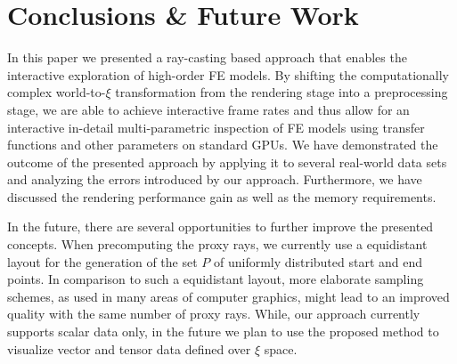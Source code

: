 \documentclass[journal]{vgtc}                %
\begin{document}
\section{Conclusions \& Future Work}\label{sec:conclusions}
In this paper we presented a ray-casting based approach that enables the interactive exploration of high-order FE models. By shifting the computationally complex world-to-$\xi$ transformation from the rendering stage into a preprocessing stage, we are able to achieve interactive frame rates and thus allow for an interactive in-detail multi-parametric inspection of FE models using transfer functions and other parameters on standard GPUs. We have demonstrated the outcome of the presented approach by applying it to several real-world data sets and analyzing the errors introduced by our approach. Furthermore, we have discussed the rendering performance gain as well as the memory requirements.

In the future, there are several opportunities to further improve the presented concepts. When precomputing the proxy rays, we currently use a equidistant layout for the generation of the set $P$ of uniformly distributed start and end points. In comparison to such a equidistant layout, more elaborate sampling schemes, as used in many areas of computer graphics, might lead to an improved quality with the same number of proxy rays. While, our approach currently supports scalar data only, in the future we plan to use the proposed method to visualize vector and tensor data defined over $\xi$ space.
%
%
%

\newpage



\end{document}
